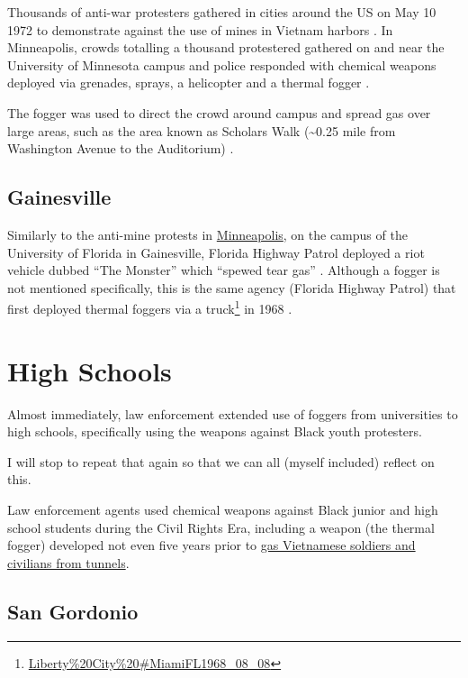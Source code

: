 \documentclass[
  11pt,
]{krantz}
\renewcommand{\href}[2]{#2\footnote{\url{#1}}}
\begin{document}
Thousands of anti-war protesters gathered in cities around the US on May 10 1972 to demonstrate against the use of mines in Vietnam harbors \citep{ArgusLeader1972_05_11a}.
In Minneapolis, crowds totalling a thousand protestered gathered on and near the University of Minnesota campus and police responded with chemical weapons deployed via grenades, sprays, a helicopter and a thermal fogger \citep{ArgusLeader1972_05_11b, StarTribune1972_05_11}.

The fogger was used to direct the crowd around campus and spread gas over large areas, such as the area known as Scholars Walk (\textasciitilde0.25 mile from Washington Avenue to the Auditorium) \citep{StarTribune1972_05_11}.

\hypertarget{gainesville}{%
\section*{Gainesville}\label{gainesville}}


Similarly to the anti-mine protests in \protect\hyperlink{Minneapolis1972_05_10}{Minneapolis}, on the campus of the University of Florida in Gainesville, Florida Highway Patrol deployed a riot vehicle dubbed ``The Monster'' which ``spewed tear gas'' \citep{ArgusLeader1972_05_11b}.
Although a fogger is not mentioned specifically, this is the same agency (Florida Highway Patrol) that first \href{Liberty\%20City\%20\#MiamiFL1968_08_08}{deployed thermal foggers via a truck} in 1968 \citep{Tschenschlok1995, Lorentzen2018}.

\hypertarget{high-schools}{%
\chapter*{High Schools}\label{high-schools}}


Almost immediately, law enforcement extended use of foggers from \protect\hypertarget{Universities}{}{universities} to high schools, specifically using the weapons against Black youth protesters.

I will stop to repeat that again so that we can all (myself included) reflect on this.

Law enforcement agents used chemical weapons against Black junior and high school students during the Civil Rights Era, including a weapon (the thermal fogger) developed not even five years prior to \protect\hyperlink{Vietnam}{gas Vietnamese soldiers and civilians from tunnels}.

\hypertarget{SanGordonio}{%
\section*{San Gordonio}\label{SanGordonio}}
\end{document}
